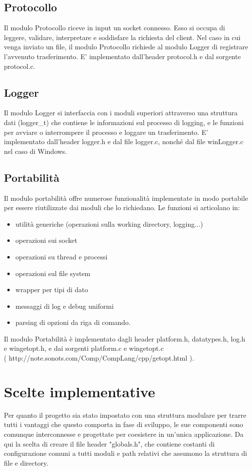 \documentclass{article}
\begin{document}
\subsection{Protocollo}
Il modulo Protocollo riceve in input un socket connesso.
Esso si occupa di leggere, validare, interpretare e soddisfare la richiesta del client.
Nel caso in cui venga inviato un file, il modulo Protocollo richiede al modulo Logger di registrare 
l'avvenuto trasferimento.
E' implementato dall'header protocol.h e dal sorgente protocol.c.

\subsection{Logger}
Il modulo Logger si interfaccia con i moduli superiori attraverso una struttura dati (logger\_t) che
contiene le informazioni sul processo di logging, e le funzioni per avviare o interrompere il processo
e loggare un trasferimento.
E' implementato dall'header logger.h e dal file logger.c, nonché dal file winLogger.c nel caso di Windows. 


\subsection{Portabilità}
Il modulo portabilità offre numerose funzionalità implementate in modo portabile per essere riutilizzate
dai moduli che lo richiedano. Le funzioni si articolano in:
\begin{itemize}
    \item utilità generiche (operazioni sulla working directory, logging...)
    \item operazioni sui socket
    \item operazioni su thread e processi
    \item operazioni sul file system
    \item wrapper per tipi di dato
    \item messaggi di log e debug uniformi
    \item parsing di opzioni da riga di comando.
\end{itemize}
Il modulo Portabilità è implementato dagli header platform.h, datatypes.h, log.h e wingetopt.h, e dai 
sorgenti platform.c e wingetopt.c \\( http://note.sonots.com/Comp/CompLang/cpp/getopt.html ). 
\newpage


\section{Scelte implementative}

Per quanto il progetto sia stato impostato con una struttura modulare per trarre tutti i vantaggi che 
questo comporta in fase di sviluppo, le sue componenti sono comunque interconnesse e progettate per coesistere 
in un'unica applicazione. Da qui la scelta di creare il file header "globals.h", che contiene
costanti di configurazione comuni a tutti moduli e path relativi che assumono la struttura 
di file e directory.
\end{document}
